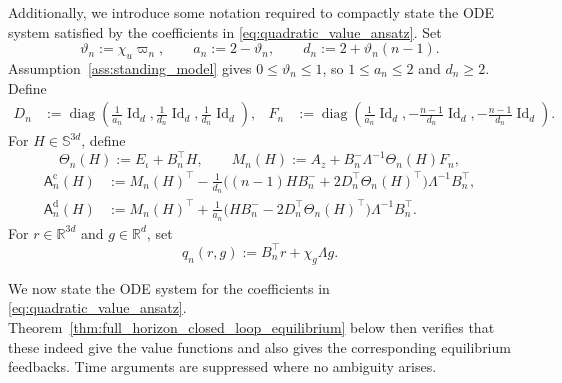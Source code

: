 \documentclass[12pt]{article}
\numberwithin{equation}{section}
\theoremstyle{definition}
\begin{document}
Additionally, we introduce some notation required to compactly state the
ODE system satisfied by the coefficients in \eqref{eq:quadratic_value_ansatz}.
Set
\begin{equation}\label{eq:fixed_interval_a_d_def}
\vartheta_n:=\chi_u\varpi_n,
\qquad
a_n:=2-\vartheta_n,
\qquad
d_n:=2+\vartheta_n(n-1).
\end{equation}
Assumption~\ref{ass:standing_model} gives \(0\leq\vartheta_n\leq1\), so
\(1\leq a_n\leq2\) and \(d_n\geq2\). Define
\begin{equation}\label{eq:fixed_interval_D_def}
\begin{aligned}
D_n&:=\operatorname{diag}\left(
\tfrac{1}{a_n}\operatorname{Id}_d,
\tfrac{1}{d_n}\operatorname{Id}_d,
\tfrac{1}{d_n}\operatorname{Id}_d\right),
&
F_n&:=\operatorname{diag}\left(
\tfrac{1}{a_n}\operatorname{Id}_d,
-\tfrac{n-1}{d_n}\operatorname{Id}_d,
-\tfrac{n-1}{d_n}\operatorname{Id}_d\right).
\end{aligned}
\end{equation}
For \(H\in\mathbb S^{3d}\), define
\begin{equation}\label{eq:fixed_interval_matrix_maps_def}
\Theta_n(H):=E_\iota+B_n^\top H,
\qquad
M_n(H):=A_z+B_n^{-}\Lambda^{-1}\Theta_n(H)F_n,
\end{equation}
\begin{subequations}\label{eq:pre_ann_matrix_maps_def}
\begin{align}
\mathsf A_n^{\mathrm c}(H)
&:=M_n(H)^\top-\tfrac{1}{d_n}
\bigl((n-1)HB_n^{-}+2D_n^\top\Theta_n(H)^\top\bigr)
\Lambda^{-1}B_n^\top,\\
\mathsf A_n^{\mathrm d}(H)
&:=M_n(H)^\top+\tfrac{1}{a_n}
\bigl(HB_n^{-}-2D_n^\top\Theta_n(H)^\top\bigr)
\Lambda^{-1}B_n^\top.
\end{align}
\end{subequations}
For \(r\in\mathbb R^{3d}\) and \(g\in\mathbb R^d\), set
\begin{equation}\label{eq:post_ann_q_def}
q_n(r,g):=B_n^\top r+\chi_g\Lambda g.
\end{equation}


We now state the ODE system for the coefficients in
\eqref{eq:quadratic_value_ansatz}.
Theorem~\ref{thm:full_horizon_closed_loop_equilibrium} below then verifies
that these indeed give the value functions and also gives the
corresponding equilibrium feedbacks. Time arguments are suppressed where no
ambiguity arises.
\end{document}
